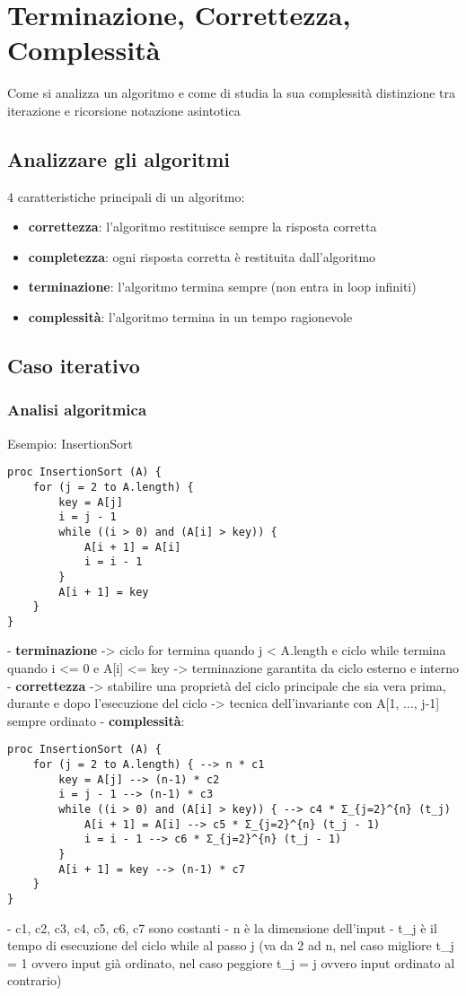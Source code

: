 \section{Terminazione, Correttezza, Complessità}
Come si analizza un algoritmo e come di studia la sua complessità
distinzione tra iterazione e ricorsione
notazione asintotica

\subsection{Analizzare gli algoritmi}
4 caratteristiche principali di un algoritmo:
\begin{itemize}
\item \textbf{correttezza}: l'algoritmo restituisce sempre la risposta corretta
\item \textbf{completezza}: ogni risposta corretta è restituita dall'algoritmo
\item \textbf{terminazione}: l'algoritmo termina sempre (non entra in loop infiniti)
\item \textbf{complessità}: l'algoritmo termina in un tempo ragionevole
\end{itemize}

\subsection{Caso iterativo}
\subsubsection{Analisi algoritmica}
Esempio: InsertionSort
\begin{verbatim}
proc InsertionSort (A) {
    for (j = 2 to A.length) {
        key = A[j]
        i = j - 1
        while ((i > 0) and (A[i] > key)) {
            A[i + 1] = A[i]
            i = i - 1
        }
        A[i + 1] = key
    }
}
\end{verbatim}
- \textbf{terminazione} -> ciclo for termina quando j < A.length e ciclo while termina quando i <= 0 e A[i] <= key -> terminazione garantita da ciclo esterno e interno
- \textbf{correttezza} -> stabilire una proprietà del ciclo principale che sia vera prima, durante e dopo l'esecuzione del ciclo -> tecnica dell'invariante con A[1, ..., j-1] sempre ordinato
- \textbf{complessità}:
\begin{verbatim}
proc InsertionSort (A) {
    for (j = 2 to A.length) { --> n * c1
        key = A[j] --> (n-1) * c2
        i = j - 1 --> (n-1) * c3
        while ((i > 0) and (A[i] > key)) { --> c4 * Σ_{j=2}^{n} (t_j)
            A[i + 1] = A[i] --> c5 * Σ_{j=2}^{n} (t_j - 1)
            i = i - 1 --> c6 * Σ_{j=2}^{n} (t_j - 1)
        }
        A[i + 1] = key --> (n-1) * c7
    }
}
\end{verbatim}
- c1, c2, c3, c4, c5, c6, c7 sono costanti
- n è la dimensione dell'input
- t_j è il tempo di esecuzione del ciclo while al passo j (va da 2 ad n, nel caso migliore t_j = 1 ovvero input già ordinato, nel caso peggiore t_j = j ovvero input ordinato al contrario)

